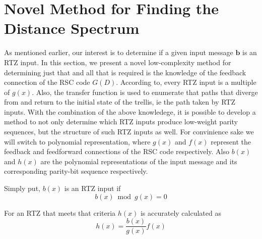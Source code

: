 \section{Novel Method for Finding the Distance Spectrum }
\label{sec4}
As mentioned earlier, our interest is to determine if a given input message $\textbf{b}$ is an RTZ input. In this section, we present a novel low-complexity method for determining just that and all that is required is the knowledge of the feedback connection of the RSC code $G(D)$.  
According to\cite{ref6}, every RTZ input is a multiple of $g(x)$. Also, the transfer function is used to enumerate that paths that diverge from and return to the initial state of the trellis, ie the path taken by RTZ inputs. With the combination of the above knowledege, it is possible to develop a method to not only determine which RTZ inputs produce low-weight parity sequences, but the structure of such RTZ inputs as well. 
For convinience sake we will switch to polynomial representation, where $g(x)$ and $f(x)$ represent the feedback and feedforward connections of the RSC code respectively. Also $b(x)$ and $h(x)$ are the polynomial representations of the input message and its corresponding parity-bit sequence respectively.

Simply put, $b(x)$ is an RTZ input if 
\begin{equation}
b(x) \bmod g(x) =0
\label{eq1}
\end{equation}

For an RTZ that meets that criteria $h(x)$ is accurately calculated as
\begin{equation}
h(x) =\frac{b(x)}{g(x)}f(x)
\label{eq2}
\end{equation}


